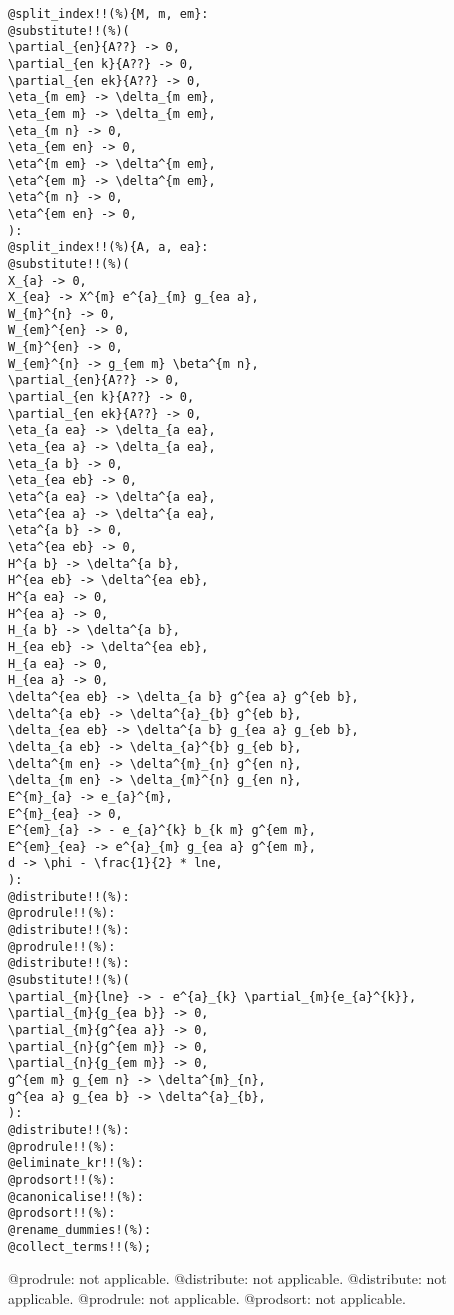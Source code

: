 \documentclass[11pt]{article}
\begin{document}
{\color[named]{Blue}\begin{verbatim}
@split_index!!(%){M, m, em}:
@substitute!!(%)(
\partial_{en}{A??} -> 0,
\partial_{en k}{A??} -> 0,
\partial_{en ek}{A??} -> 0,
\eta_{m em} -> \delta_{m em},
\eta_{em m} -> \delta_{m em},
\eta_{m n} -> 0,
\eta_{em en} -> 0,
\eta^{m em} -> \delta^{m em},
\eta^{em m} -> \delta^{m em},
\eta^{m n} -> 0,
\eta^{em en} -> 0,
):
@split_index!!(%){A, a, ea}:
@substitute!!(%)(
X_{a} -> 0,
X_{ea} -> X^{m} e^{a}_{m} g_{ea a},
W_{m}^{n} -> 0,
W_{em}^{en} -> 0,
W_{m}^{en} -> 0,
W_{em}^{n} -> g_{em m} \beta^{m n},
\partial_{en}{A??} -> 0,
\partial_{en k}{A??} -> 0,
\partial_{en ek}{A??} -> 0,
\eta_{a ea} -> \delta_{a ea},
\eta_{ea a} -> \delta_{a ea},
\eta_{a b} -> 0,
\eta_{ea eb} -> 0,
\eta^{a ea} -> \delta^{a ea},
\eta^{ea a} -> \delta^{a ea},
\eta^{a b} -> 0,
\eta^{ea eb} -> 0,
H^{a b} -> \delta^{a b},
H^{ea eb} -> \delta^{ea eb},
H^{a ea} -> 0,
H^{ea a} -> 0,
H_{a b} -> \delta^{a b},
H_{ea eb} -> \delta^{ea eb},
H_{a ea} -> 0,
H_{ea a} -> 0,
\delta^{ea eb} -> \delta_{a b} g^{ea a} g^{eb b},
\delta^{a eb} -> \delta^{a}_{b} g^{eb b},
\delta_{ea eb} -> \delta^{a b} g_{ea a} g_{eb b},
\delta_{a eb} -> \delta_{a}^{b} g_{eb b},
\delta^{m en} -> \delta^{m}_{n} g^{en n},
\delta_{m en} -> \delta_{m}^{n} g_{en n},
E^{m}_{a} -> e_{a}^{m},
E^{m}_{ea} -> 0,
E^{em}_{a} -> - e_{a}^{k} b_{k m} g^{em m},
E^{em}_{ea} -> e^{a}_{m} g_{ea a} g^{em m},
d -> \phi - \frac{1}{2} * lne,
):
@distribute!!(%):
@prodrule!!(%):
@distribute!!(%):
@prodrule!!(%):
@distribute!!(%):
@substitute!!(%)(
\partial_{m}{lne} -> - e^{a}_{k} \partial_{m}{e_{a}^{k}},
\partial_{m}{g_{ea b}} -> 0,
\partial_{m}{g^{ea a}} -> 0,
\partial_{n}{g^{em m}} -> 0,
\partial_{n}{g_{em m}} -> 0,
g^{em m} g_{em n} -> \delta^{m}_{n},
g^{ea a} g_{ea b} -> \delta^{a}_{b},
):
@distribute!!(%):
@prodrule!!(%):
@eliminate_kr!!(%):
@prodsort!!(%):
@canonicalise!!(%):
@prodsort!!(%):
@rename_dummies!(%):
@collect_terms!!(%);
\end{verbatim}}
@prodrule: not applicable.
@distribute: not applicable.
@distribute: not applicable.
@prodrule: not applicable.
@prodsort: not applicable.
\end{document}
